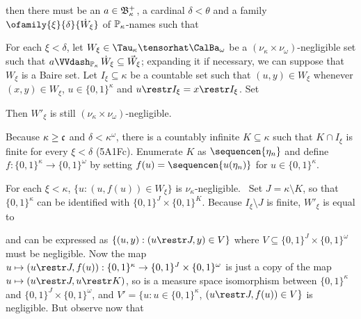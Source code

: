 {

\noindent then there must be an $a\in\frak B_{\kappa}^+$, a cardinal $\delta<\theta$
and a family $\ofamily{\xi}{\delta}{\dot W_{\xi}}$ of $\Bbb P_{\kappa}$-names such
that


\noindent For each $\xi<\delta$, let
$W_{\xi}\in\Tau_{\kappa}\tensorhat\CalBa_{\omega}$ be a
$(\nu_{\kappa}\times\nu_{\omega})$-negligible set such that
$a\VVdPk\,\dot W_{\xi}\subseteq\vec W_{\xi}$;  expanding it if
necessary, we can suppose that $W_{\xi}$ is a Baire set.   Let
$I_{\xi}\subseteq\kappa$ be a countable set
such that $(u,y)\in W_{\xi}$ whenever
$(x,y)\in W_{\xi}$, $u\in\{0,1\}^{\kappa}$ and
$u\restr I_{\xi}=x\restr I_{\xi}$.   Set


\noindent Then $W'_{\xi}$ is still
$(\nu_{\kappa}\times\nu_{\omega})$-negligible.

Because $\kappa\ge\frak c$ and $\delta<\kappa^{\omega}$,
there is a countably infinite $K\subseteq\kappa$ such that $K\cap I_{\xi}$
is finite for every $\xi<\delta$ (5A1Fc).   Enumerate $K$ as
$\sequencen{\eta_n}$ and define $f:\{0,1\}^{\kappa}\to\{0,1\}^{\omega}$ by
setting $f(u)=\sequencen{u(\eta_n)}$ for $u\in\{0,1\}^{\kappa}$.

For each $\xi<\kappa$, $\{u:(u,f(u))\in W_{\xi}\}$ is
$\nu_{\kappa}$-negligible.   \Prf\ Set $J=\kappa\setminus K$,
so that $\{0,1\}^{\kappa}$ can be identified with
$\{0,1\}^J\times\{0,1\}^K$.   Because $I_{\xi}\setminus J$ is finite,
$W'_{\xi}$ is equal to


\noindent and can be expressed as
$\{(u,y):(u\restr J,y)\in V\}$ where
$V\subseteq\{0,1\}^J\times\{0,1\}^{\omega}$ must be
negligible.   Now the map $u\mapsto(u\restr J,f(u)):
\{0,1\}^{\kappa}\to\{0,1\}^J\times\{0,1\}^{\omega}$ is just a copy of the
map $u\mapsto(u\restr J,u\restr K)$, so is a measure space isomorphism
between $\{0,1\}^{\kappa}$ and $\{0,1\}^J\times\{0,1\}^{\omega}$, and
$V'=\{u:u\in\{0,1\}^{\kappa}$, $(u\restr J,f(u))\in V\}$ is negligible.
But observe now that

}
